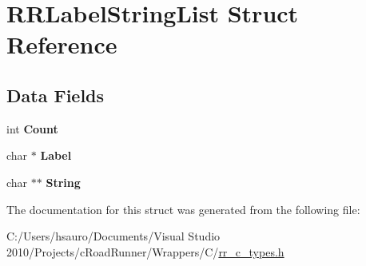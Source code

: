 \hypertarget{struct_r_r_label_string_list}{
\section{\-R\-R\-Label\-String\-List \-Struct \-Reference}
\label{struct_r_r_label_string_list}
}
\subsection*{\-Data \-Fields}
\begin{DoxyCompactItemize}
\item 
\hypertarget{struct_r_r_label_string_list_aad462966ed963f892117056de1eba502}{
int {\bfseries \-Count}}
\label{struct_r_r_label_string_list_aad462966ed963f892117056de1eba502}

\item 
\hypertarget{struct_r_r_label_string_list_af91fd2b26f73a15052d23933bee0ed5a}{
char $\ast$ {\bfseries \-Label}}
\label{struct_r_r_label_string_list_af91fd2b26f73a15052d23933bee0ed5a}

\item 
\hypertarget{struct_r_r_label_string_list_acdbc34377baf3e52d9044aada0f2f511}{
char $\ast$$\ast$ {\bfseries \-String}}
\label{struct_r_r_label_string_list_acdbc34377baf3e52d9044aada0f2f511}

\end{DoxyCompactItemize}


\-The documentation for this struct was generated from the following file\-:\begin{DoxyCompactItemize}
\item 
\-C\-:/\-Users/hsauro/\-Documents/\-Visual Studio 2010/\-Projects/c\-Road\-Runner/\-Wrappers/\-C/\hyperlink{rr__c__types_8h}{rr\-\_\-c\-\_\-types.\-h}\end{DoxyCompactItemize}
